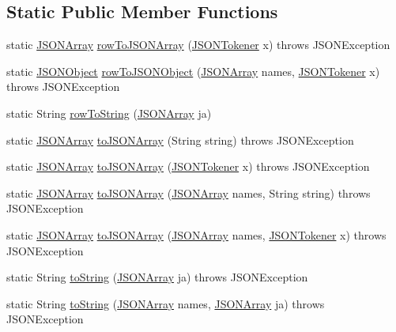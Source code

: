 \subsection*{Static Public Member Functions}
\begin{DoxyCompactItemize}
\item 
static \hyperlink{classorg_1_1json_1_1JSONArray}{J\-S\-O\-N\-Array} \hyperlink{classorg_1_1json_1_1CDL_acecd36f26ee8966dea2cd9dcd5683331}{row\-To\-J\-S\-O\-N\-Array} (\hyperlink{classorg_1_1json_1_1JSONTokener}{J\-S\-O\-N\-Tokener} x)  throws J\-S\-O\-N\-Exception 
\item 
static \hyperlink{classorg_1_1json_1_1JSONObject}{J\-S\-O\-N\-Object} \hyperlink{classorg_1_1json_1_1CDL_a1903e6355ac99487c50bac0c70a618ff}{row\-To\-J\-S\-O\-N\-Object} (\hyperlink{classorg_1_1json_1_1JSONArray}{J\-S\-O\-N\-Array} names, \hyperlink{classorg_1_1json_1_1JSONTokener}{J\-S\-O\-N\-Tokener} x)  throws J\-S\-O\-N\-Exception 
\item 
static String \hyperlink{classorg_1_1json_1_1CDL_ad428294b24ca60b441e60fa6b7b168bc}{row\-To\-String} (\hyperlink{classorg_1_1json_1_1JSONArray}{J\-S\-O\-N\-Array} ja)
\item 
static \hyperlink{classorg_1_1json_1_1JSONArray}{J\-S\-O\-N\-Array} \hyperlink{classorg_1_1json_1_1CDL_a0d7e17e87f97c37d9326e3347a8abf2b}{to\-J\-S\-O\-N\-Array} (String string)  throws J\-S\-O\-N\-Exception 
\item 
static \hyperlink{classorg_1_1json_1_1JSONArray}{J\-S\-O\-N\-Array} \hyperlink{classorg_1_1json_1_1CDL_ace400a8f91feb12d6d823757a7641f8b}{to\-J\-S\-O\-N\-Array} (\hyperlink{classorg_1_1json_1_1JSONTokener}{J\-S\-O\-N\-Tokener} x)  throws J\-S\-O\-N\-Exception 
\item 
static \hyperlink{classorg_1_1json_1_1JSONArray}{J\-S\-O\-N\-Array} \hyperlink{classorg_1_1json_1_1CDL_ae2085eaedac675d9fa3e151d5d8de607}{to\-J\-S\-O\-N\-Array} (\hyperlink{classorg_1_1json_1_1JSONArray}{J\-S\-O\-N\-Array} names, String string)  throws J\-S\-O\-N\-Exception 
\item 
static \hyperlink{classorg_1_1json_1_1JSONArray}{J\-S\-O\-N\-Array} \hyperlink{classorg_1_1json_1_1CDL_af55973f9de779acb04e33b0198a5525c}{to\-J\-S\-O\-N\-Array} (\hyperlink{classorg_1_1json_1_1JSONArray}{J\-S\-O\-N\-Array} names, \hyperlink{classorg_1_1json_1_1JSONTokener}{J\-S\-O\-N\-Tokener} x)  throws J\-S\-O\-N\-Exception 
\item 
static String \hyperlink{classorg_1_1json_1_1CDL_a4a90929f59ce156378c84830d5f341ad}{to\-String} (\hyperlink{classorg_1_1json_1_1JSONArray}{J\-S\-O\-N\-Array} ja)  throws J\-S\-O\-N\-Exception 
\item 
static String \hyperlink{classorg_1_1json_1_1CDL_a85fc54efa24cb7dad1f615b1d659772f}{to\-String} (\hyperlink{classorg_1_1json_1_1JSONArray}{J\-S\-O\-N\-Array} names, \hyperlink{classorg_1_1json_1_1JSONArray}{J\-S\-O\-N\-Array} ja)  throws J\-S\-O\-N\-Exception 
\end{DoxyCompactItemize}


